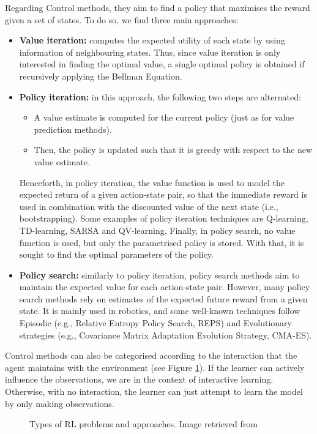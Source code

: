 \documentclass[12pt, a4paper,twoside]{tesi_upf}
\begin{document}
			Regarding Control methods, they aim to find a policy that maximises the reward given a set of states. To do so, we find three main approaches: 
			\begin{itemize}
				\item \textbf{Value iteration:} computes the expected utility of each state by using information of neighbouring states. Thus, since value iteration is only interested in finding the optimal value, a single optimal policy is obtained if recursively applying the Bellman Equation.
				\item \textbf{Policy iteration:} in this approach, the following two steps are alternated: 
				\begin{itemize}									
					\item A value estimate is computed for the current policy (just as for value prediction methods).
					\item Then, the policy is updated such that it is greedy with respect to the new value estimate.					
				\end{itemize}			
				Henceforth, in policy iteration, the value function is used to model the expected return of a given action-state pair, so that the immediate reward is used in combination with the discounted value of the next state (i.e., bootstrapping). Some examples of policy iteration techniques are Q-learning, TD-learning, SARSA and QV-learning. Finally, in policy search, no value function is used, but only the parametrised policy is stored. With that, it is sought to find the optimal parameters of the policy.
				\item \textbf{Policy search:}
				similarly to policy iteration, policy search methods aim to maintain the expected value for each action-state pair. However, many policy search methods rely on estimates of the expected future reward from a given state. It is mainly used in robotics, and some well-known techniques follow Episodic (e.g., Relative Entropy Policy Search, REPS) and Evolutionary strategies (e.g., Covariance Matrix Adaptation Evolution Strategy, CMA-ES).
			\end{itemize}   
			Control methods can also be categorised according to the interaction that the agent maintains with the environment (see Figure \ref{fig:rl_control_types}). If the learner can actively influence the observations, we are in the context of interactive learning. Otherwise, with no interaction, the learner can just attempt to learn the model by only making observations.
			\begin{figure}[h!]
				\centering
				\caption{Types of RL problems and approaches. Image retrieved from \cite{szepesvari2010algorithms}}
				\label{fig:rl_control_types}
			\end{figure}
					
\end{document}
